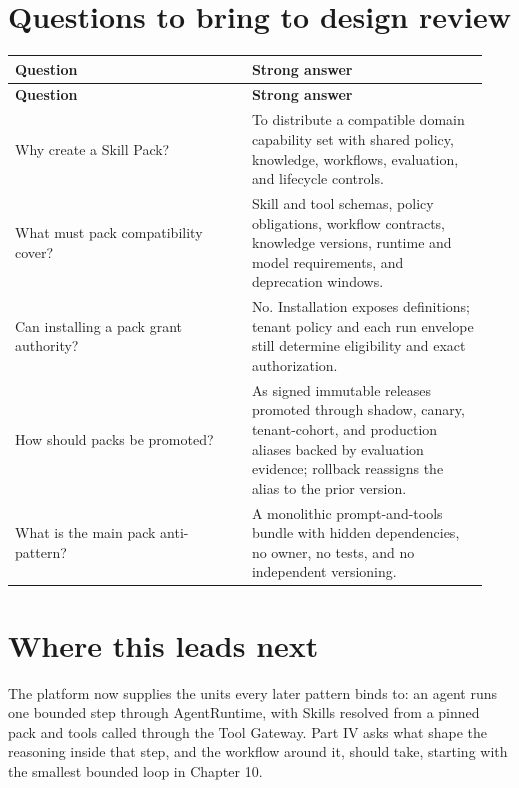 \section{Questions to bring to design review}

\BookTableStart
\small
\begin{longtable}{@{}Y{0.4700\linewidth}Y{0.4700\linewidth}@{}}
\color{white}\bfseries \textbf{Question} & \color{white}\bfseries \textbf{Strong answer} \\
\endfirsthead
{}
\color{white}\bfseries \textbf{Question} & \color{white}\bfseries \textbf{Strong answer} \\
\endhead
Why create a Skill Pack? & To distribute a compatible domain capability set with shared policy, knowledge, workflows, evaluation, and lifecycle controls. \\
What must pack compatibility cover? & Skill and tool schemas, policy obligations, workflow contracts, knowledge versions, runtime and model requirements, and deprecation windows. \\
Can installing a pack grant authority? & No. Installation exposes definitions; tenant policy and each run envelope still determine eligibility and exact authorization. \\
How should packs be promoted? & As signed immutable releases promoted through shadow, canary, tenant-cohort, and production aliases backed by evaluation evidence; rollback reassigns the alias to the prior version. \\
What is the main pack anti-pattern? & A monolithic prompt-and-tools bundle with hidden dependencies, no owner, no tests, and no independent versioning. \\
\end{longtable}
\BookTableEnd

\section{Where this leads next}

The platform now supplies the units every later pattern binds to: an agent runs one bounded step through AgentRuntime, with Skills resolved from a pinned pack and tools called through the Tool Gateway. Part IV asks what shape the reasoning inside that step, and the workflow around it, should take, starting with the smallest bounded loop in Chapter 10.\par

